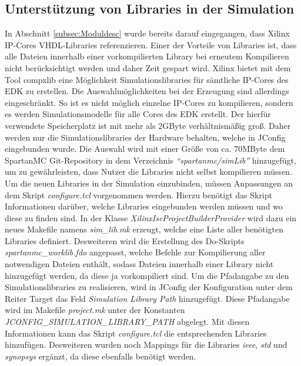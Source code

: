 \subsection{Unterstützung von Libraries in der Simulation}
In Abschnitt \ref{subsec:Moduldesc} wurde bereits darauf eingegangen, dass Xilinx IP-Cores VHDL-Libraries referenzieren. Einer der Vorteile von Libraries ist, dass alle Dateien innerhalb einer vorkompilierten Library bei erneutem Kompilieren nicht berücksichtigt werden und daher Zeit gespart wird. Xilinx bietet mit dem Tool compxlib eine Möglichkeit Simulationslibraries für sämtliche IP-Cores des EDK zu erstellen. Die Auswahlmöglichkeiten bei der Erzeugung sind allerdings eingeschränkt. So ist es nicht möglich einzelne IP-Cores zu kompilieren, sondern es werden Simulationsmodelle für alle Cores des EDK erstellt. Der hierfür verwendete Speicherplatz ist mit mehr als 2GByte verhältnismäßig groß. Daher werden nur die Simulationslibraries der Hardware behalten, welche in JConfig eingebunden wurde. Die Auswahl wird mit einer Größe von ca. 70MByte dem SpartanMC Git-Repository in dem Verzeichnis \textit{``spartanmc/simLib''} hinzugefügt, um zu gewährleisten, dass Nutzer die Libraries nicht selbst kompilieren müssen.\\
Um die neuen Libraries in der Simulation einzubinden, müssen Anpassungen an dem Skript \textit{configure.tcl} vorgenommen werden. Hierzu benötigt das Skript Informationen darüber, welche Libraries eingebunden werden müssen und wo diese zu finden sind. In der Klasse \textit{XilinxIseProjectBuilderProvider} wird dazu ein neues Makefile namens \textit{sim\_lib.mk} erzeugt, welche eine Liste aller benötigten Libraries definiert. Desweiteren wird die Erstellung des Do-Skripts \textit{spartanmc\_worklib.fdo} angepasst, welche Befehle zur Kompilierung aller notwendigen Dateien enthält, sodass Dateien innerhalb einer Library nicht hinzugefügt werden, da diese ja vorkompiliert sind. Um die Pfadangabe zu den Simulationslibraries zu realisieren, wird in JConfig der Konfiguration unter dem Reiter Target das Feld \textit{Simulation Library Path} hinzugefügt. Diese Pfadangabe wird im Makefile \textit{project.mk} unter der Konstanten \textit{JCONFIG\_SIMULATION\_LIBRARY\_PATH} abgelegt. Mit diesen Informationen kann das Skript \textit{configure.tcl} die entsprechenden Libraries hinzufügen. Desweiteren wurden noch Mappings für die Libraries \textit{ieee}, \textit{std} und \textit{synopsys} ergänzt, da diese ebenfalls benötigt werden.
